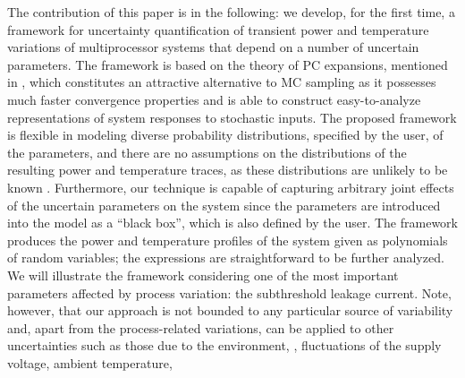 
The contribution of this paper is in the following: we develop, for the first time, a framework for uncertainty quantification of transient power and temperature variations of multiprocessor systems that depend on a number of uncertain parameters.
The framework is based on the theory of PC expansions, mentioned in , which constitutes an attractive alternative to MC sampling as it possesses much faster convergence properties and is able to construct easy-to-analyze representations of system responses to stochastic inputs.
The proposed framework is flexible in modeling diverse probability distributions, specified by the user, of the parameters, and there are no assumptions on the distributions of the resulting power and temperature traces, as these distributions are unlikely to be known \apriori.
Furthermore, our technique is capable of capturing arbitrary joint effects of the uncertain parameters on the system since the parameters are introduced into the model as a ``black box'', which is also defined by the user.
The framework produces the power and temperature profiles of the system given as polynomials of random variables; the expressions are straightforward to be further analyzed. We will illustrate the framework considering one of the most important parameters affected by process variation: the subthreshold leakage current.
Note, however, that our approach is not bounded to any particular source of variability and, apart from the process-related variations, can be applied to other uncertainties such as those due to the environment, \ie, fluctuations of the supply voltage, ambient temperature, \etc
